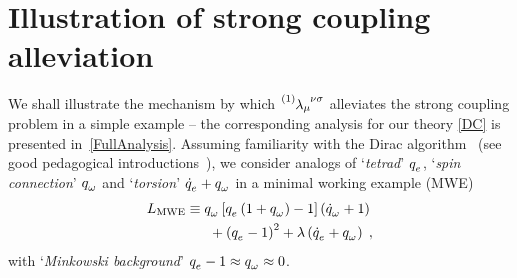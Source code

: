 \documentclass[aps,prd,reprint,preprintnumbers,showpacs,floatfix,nofootinbib,superscript address,longbibliography]{revtex4-1}
\begin{document}
\section{Illustration of strong coupling alleviation} 
We shall illustrate the mechanism by which $\TLambda[1]{_{\mu}^{\nu\sigma}}$ alleviates the strong coupling problem in a simple example -- the corresponding analysis for our theory \eqref{DC} is presented in~\cref{FullAnalysis}. Assuming familiarity with the Dirac algorithm~\cite{Anderson:1951ta,Bergmann:1954tc,Castellani:1981us,Yo:2001sy,1999IJMPD...8..459Y,Chen:1998ad} (see good pedagogical introductions~\cite{Golovnev:2022rui,Henneaux:1992ig,Blagojevic:2002}), we consider analogs of `\emph{tetrad}' $\qe{}$, `\emph{spin connection}' $\qw{}$ and `\emph{torsion}' $\dqe{}+\qw{}$ in a minimal working example (MWE)
\begin{equation}\label{MWE}
	\begin{aligned}
		L_{\text{MWE}}&\equiv\qw{}\left[\qe{}\left(1+\qw{}\right)-1\right]\left(\dqw{}+1\right)\\
			&\ \ \ \ \ +\left(\qe{}-1\right)^2+\lambda\left(\dqe{}+\qw{}\right) \;,
	\end{aligned}
\end{equation}
with `\emph{Minkowski background}' $\qe{}-1\approx\qw{}\approx0$.
\end{document}
